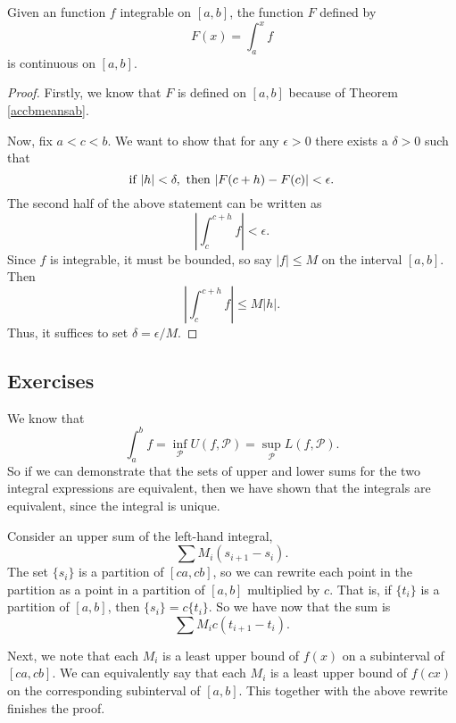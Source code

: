 \begin{theorem} \label{intfcont}
Given an function $f$ integrable on $[a, b]$, the function $F$ defined by 
\[ F(x) = \int_a^x f \]
is continuous on $[a, b]$.
\begin{proof}
Firstly, we know that $F$ is defined on $[a, b]$ because of Theorem \ref{accbmeansab}.

Now, fix $a < c < b$. We want to show that for any $\epsilon > 0$ there exists a $\delta > 0$ such that 
\[ \rmif\ |h| < \delta,\ \rmthen\ |F(c+h)-F(c)| < \epsilon. \]
The second half of the above statement can be written as 
\[ \left|\int_c^{c+h} f\right| < \epsilon. \]
Since $f$ is integrable, it must be bounded, so say $|f| \le M$ on the interval $[a, b]$. Then
\[ \left|\int_c^{c+h} f\right| \le M|h|. \]
Thus, it suffices to set $\delta = \epsilon / M$.
\end{proof}
\end{theorem}

\subsection{Exercises}

\begin{problem}[13-17]
We know that 
\[ \int_a^b f = \inf_{\mathscr{P}} U(f, \mathscr{P}) = \sup_{\mathscr{P}} L(f, \mathscr{P}). \]
So if we can demonstrate that the sets of upper and lower sums for the two integral expressions are equivalent, then we have shown that the integrals are equivalent, since the integral is unique. 

Consider an upper sum of the left-hand integral, 
\[ \sum M_i(s_{i+1}-s_i). \]
The set $\{s_i\}$ is a partition of $[ca, cb]$, so we can rewrite each point in the partition as a point in a partition of $[a, b]$ multiplied by $c$. That is, if $\{t_i\}$ is a partition of $[a, b]$, then $\{s_i\} = c\{t_i\}$. So we have now that the sum is
\[ \sum M_ic(t_{i+1}-t_i). \]

Next, we note that each $M_i$ is a least upper bound of $f(x)$ on a subinterval of $[ca, cb]$. We can equivalently say that each $M_i$ is a least upper bound of $f(cx)$ on the corresponding subinterval of $[a, b]$. This together with the above rewrite finishes the proof. 
\end{problem}

